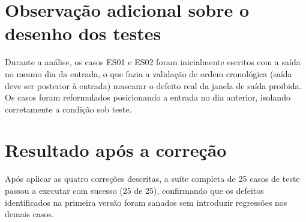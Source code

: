 \documentclass[11pt,a4paper]{article}
\begin{document}
\section*{Observação adicional sobre o desenho dos testes}

Durante a análise, os casos ES01 e ES02 foram inicialmente escritos com a
saída no mesmo dia da entrada, o que fazia a validação de ordem cronológica
(saída deve ser posterior à entrada) mascarar o defeito real da janela de
saída proibida. Os casos foram reformulados posicionando a entrada no dia
anterior, isolando corretamente a condição sob teste.

\section*{Resultado após a correção}

Após aplicar as quatro correções descritas, a suíte completa de 25 casos de
teste passou a executar com sucesso (25 de 25), confirmando que os defeitos
identificados na primeira versão foram sanados sem introduzir regressões nos
demais casos.
\end{document}
